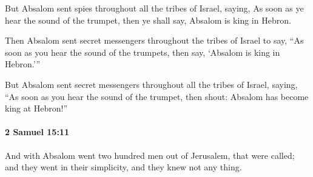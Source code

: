 			\begin{versebox}
					\item[BHS] 
					\item[ASV] But Absalom sent spies throughout all the tribes of Israel, saying, As soon as ye hear the sound of the trumpet, then ye shall say, Absalom is king in Hebron.
					\item[NIV] Then Absalom sent secret messengers throughout the tribes of Israel to say, “As soon as you hear the sound of the trumpets, then say, ‘Absalom is king in Hebron.’”
					\item[NRSV] But Absalom sent secret messengers throughout all the tribes of Israel, saying, “As soon as you hear the sound of the trumpet, then shout: Absalom has become king at Hebron!”
			\end{versebox}

		\paragraph{2 Samuel 15:11} %
			\label{2SAMUEL-15-11}

			And with Absalom went two hundred men out of Jerusalem, that were called; and they went in their simplicity, and they knew not any thing.

